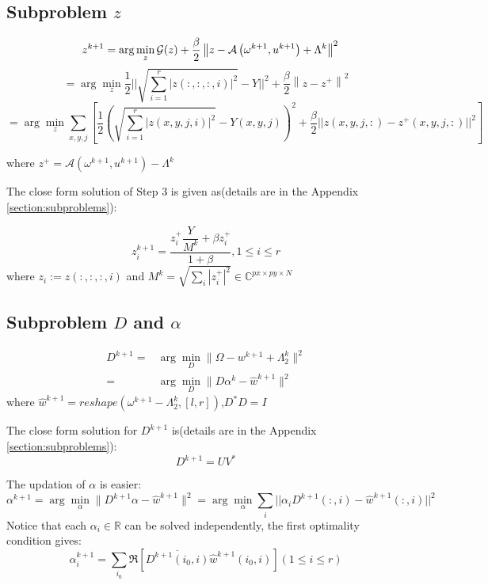\documentclass{article}
\numberwithin{equation}{section}
\begin{document}
\subsection{Subproblem $z$}
$$
 \quad z^{k+1}=\arg \min _{z} \mathcal{G}(z)+\frac{\beta}{2}\left\|z-\mathcal{A}\left(\omega^{k+1}, u^{k+1}\right)+\Lambda^{k}\right\|^{2}\\
 $$
 $$
 =\arg \min _{z} \frac{1}{2}|| \sqrt{ \sum_{i=1}^{r} |z(:,:,:,i)|^2} - Y||^2+\frac{\beta}{2}\left\|z - z^+\right\|^{2}
$$
$$
= \arg \min _{z} \sum_{x,y,j} [\frac{1}{2} ( \sqrt{ \sum_{i=1}^{r} |z(x,y,j,i)|^2} - Y(x,y,j) )^2 +
 \frac{\beta}{2}||z(x,y,j,:) - z^+(x,y,j,:)||^2 ]
$$

where $z^+ = \mathcal{A}\left(\omega^{k+1}, u^{k+1}\right) - \Lambda^{k}$


The  close form solution of Step 3 is given as(details are in the Appendix \ref{section:subproblems}):

\begin{equation}
z_i^{k+1} = \dfrac{z_i^+ \dfrac{Y}{ M^k} + \beta z_i^+}{1+\beta}, 1 \leq i \leq r
\label{zup}
\end{equation}
where $z_i:= z(:,:,:,i)$ and $M^k =\sqrt{\sum_i |z_i^+|^2} \in \mathbb{C}^{px \times py \times N}$


\subsection{Subproblem $D$ and $\alpha$} 
$$
\begin{aligned}
D^{k+1} =& \arg \min_{D} \| \Omega -  w^{k+1} + \Lambda_2^{k}\|^{2} \\
=& \arg \min_{D} \| D\alpha^k - \hat {w}^{k+1}\|^{2} 
\end{aligned}
$$
where $\hat {w}^{k+1} = reshape( \omega^{k+1} - \Lambda_2^{k},[l,r])$,$D^*D=I$

The close form solution for $D^{k+1}$ is(details are in the Appendix \ref{section:subproblems}):
\begin{equation}
D^{k+1} = UV^*
\label{Dup}
\end{equation}

The updation of $\alpha$ is easier:
$$
\alpha^{k+1} = \arg \min_{\alpha} \| D^{k+1}\alpha - \hat {w}^{k+1}\|^{2} 
= \arg \min_{\alpha} \sum_i ||\alpha_i D^{k+1}(:,i) - \hat {w}^{k+1}(:,i)||^2
$$
Notice that each $\alpha_i \in \mathbb{R}$ can be solved independently, the first optimality condition gives:
\begin{equation}
\label{alpha up}
\alpha_i^{k+1} =  \sum_{i_0} \Re[ \overline{D^{k+1}(i_0,i)} \hat {w}^{k+1}(i_0,i) ]
(1\leq i \leq r)
\end{equation}
\end{document}
